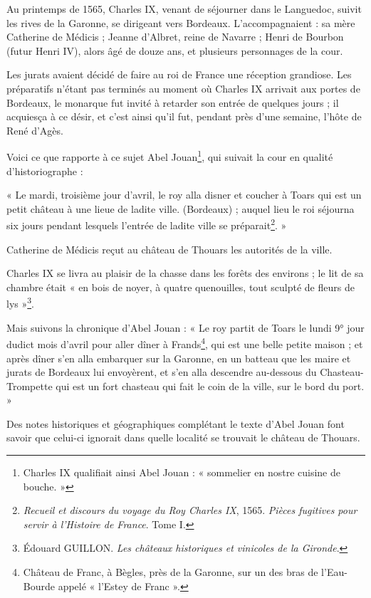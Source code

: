 \asterism{}

Au printemps de 1565, Charles IX, venant de séjourner dans le Languedoc, suivit les rives de la Garonne, se dirigeant vers Bordeaux. L'accompagnaient : sa mère Catherine de Médicis ; Jeanne d'Albret, reine de Navarre ; Henri de Bourbon (futur Henri IV), alors âgé de douze ans, et plusieurs personnages de la cour.

Les jurats avaient décidé de faire au roi de France une réception grandiose. Les préparatifs n'étant pas terminés au moment où Charles IX arrivait aux portes de Bordeaux, le monarque fut invité à retarder son entrée de quelques jours ; il acquiesça à ce désir, et c'est ainsi qu'il fut, pendant près d'une semaine, l'hôte de René d'Agès.

Voici ce que rapporte à ce sujet Abel Jouan\footnote{Charles IX qualifiait ainsi Abel Jouan : « sommelier en nostre cuisine de bouche. »}, qui suivait la cour en qualité d'historiographe :

« Le mardi, troisième jour d'avril, le roy alla disner et coucher à Toars qui est un petit château à une lieue de ladite ville. (Bordeaux) ; auquel lieu le roi séjourna six jours pendant lesquels l'entrée de ladite ville se préparait\footnote{\textit{Recueil et discours du voyage du Roy Charles IX}, 1565. \textit{Pièces fugitives pour servir à l'Histoire de France}. Tome I\ier{}.}. »

Catherine de Médicis reçut au château de Thouars les autorités de la ville.

Charles IX se livra au plaisir de la chasse dans les forêts des environs ; le lit de sa chambre était « en bois de noyer, à quatre quenouilles, tout sculpté de fleurs de lys »\footnote{Édouard GUILLON. \textit{Les châteaux historiques et vinicoles de la Gironde}.}.

Mais suivons la chronique d'Abel Jouan : « Le roy partit de Toars le lundi 9° jour dudict mois d'avril pour aller dîner à Frands\footnote{Château de Franc, à Bègles, près de la Garonne, sur un des bras de l'Eau-Bourde appelé « l'Estey de Franc ».}, qui est une belle petite maison ; et après dîner s'en alla embarquer sur la Garonne, en un batteau que les maire et jurats de Bordeaux lui envoyèrent, et s'en alla descendre au-dessous du Chasteau-Trompette qui est un fort chasteau qui fait le coin de la ville, sur le bord du port. »

Des notes historiques et géographiques complétant le texte d'Abel Jouan font savoir que celui-ci ignorait dans quelle localité se trouvait le château de Thouars.

